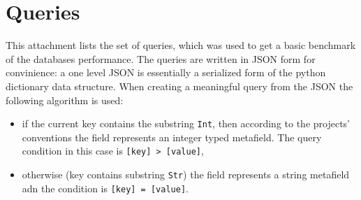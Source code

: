 \chapter{Queries} \label{app:queries}

This attachment lists the set of queries, which was used to get a basic benchmark of the databases performance.
The queries are written in JSON form for convinience: a one level JSON is essentially a serialized form of the 
python dictionary data structure. When creating a meaningful query from the JSON the following algorithm is used:

\begin{itemize}
	\item if the current key contains the substring \texttt{Int}, then according to the projects' 
		conventions the field represents an integer typed metafield. The query condition in this case is 
		\texttt{[key] > [value]},
	\item otherwise (key contains substring \texttt{Str}) the field represents a string metafield adn the condition
		is \texttt{[key] = [value]}.
\end{itemize}


